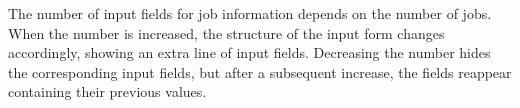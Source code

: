 \documentclass{entcs}
\begin{document}

The number of input fields for job information depends on the number of jobs. When the number is increased, the structure of the input form changes accordingly, showing an extra line of input fields. Decreasing the number hides the corresponding input fields, but after a subsequent increase, the fields reappear containing their previous values.
\end{document}
